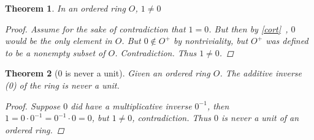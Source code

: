 \documentclass{article}
\newtheorem{thm}{Theorem}
\begin{document}
  \begin{thm} In an ordered ring $O$, $1 \neq 0$
    \begin{proof}  Assume for the sake of contradiction that $1 = 0$. But then by \eqref{cort}\ , $0$ would be the only element in $O$. But $0 \notin O^+$ by nontriviality, but $O^+$ was defined to be a nonempty subset of $O$. Contradiction. Thus $1 \neq 0$.
    \end{proof}
  \end{thm}
  \begin{thm} [$0$ is never a unit] Given an ordered ring $O$. The additive inverse (0) of the ring is never a unit.
    \begin{proof}
      Suppose $0$ did have a multiplicative inverse $0^{-1}$, then $1 = 0 \cdot 0^{-1} = 0^{-1} \cdot 0 = 0$, but $1 \neq 0$, contradiction. Thus $0$ is never a unit of an ordered ring.
    \end{proof}
  \end{thm}
\end{document}
